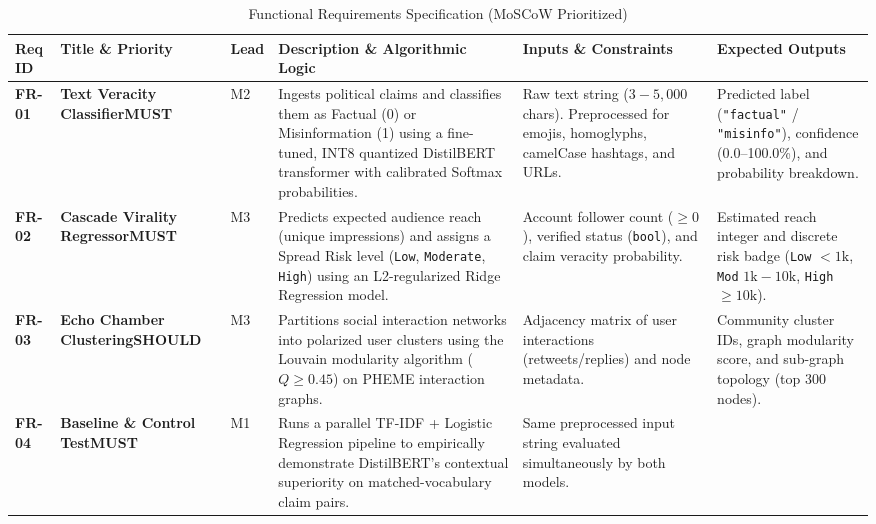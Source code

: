 \documentclass[11pt, a4paper]{article}
\newcommand{\badgeMust}{\colorbox{mustRedBg}{\textcolor{mustRedText}{\scriptsize\textsf{\textbf{MUST}}}}}
\newcommand{\badgeShould}{\colorbox{shouldAmberBg}{\textcolor{shouldAmberText}{\scriptsize\textsf{\textbf{SHOULD}}}}}
\newcommand{\code}[1]{\texttt{\small #1}}
\begin{document}
\begin{table}[H]
  \centering
  \scriptsize
  \caption{Functional Requirements Specification (MoSCoW Prioritized)}
  \label{tab:functional-requirements}
  \begin{tabularx}{\textwidth}{@{}C{1.1cm} L{2.2cm} C{0.8cm} Y L{3.1cm} L{2.8cm}@{}}
    \toprule
    \textbf{Req ID} & \textbf{Title \& Priority} & \textbf{Lead} & \textbf{Description \& Algorithmic Logic} & \textbf{Inputs \& Constraints} & \textbf{Expected Outputs} \\
    \midrule
    \textbf{FR-01} & \textbf{Text Veracity Classifier}\newline\badgeMust & M2 &
    Ingests political claims and classifies them as Factual (0) or Misinformation (1) using a fine-tuned, INT8 quantized DistilBERT transformer with calibrated Softmax probabilities. &
    Raw text string ($3 - 5,000$ chars). Preprocessed for emojis, homoglyphs, camelCase hashtags, and URLs. &
    Predicted label (\code{"factual"} / \code{"misinfo"}), confidence (0.0--100.0\%), and probability breakdown. \\
    \textbf{FR-02} & \textbf{Cascade Virality Regressor}\newline\badgeMust & M3 &
    Predicts expected audience reach (unique impressions) and assigns a Spread Risk level (\code{Low}, \code{Moderate}, \code{High}) using an L2-regularized Ridge Regression model. &
    Account follower count ($\ge 0$), verified status (\code{bool}), and claim veracity probability. &
    Estimated reach integer and discrete risk badge (\code{Low} $<1\text{k}$, \code{Mod} $1\text{k}-10\text{k}$, \code{High} $\ge 10\text{k}$). \\
    \textbf{FR-03} & \textbf{Echo Chamber Clustering}\newline\badgeShould & M3 &
    Partitions social interaction networks into polarized user clusters using the Louvain modularity algorithm ($Q \ge 0.45$) on PHEME interaction graphs. &
    Adjacency matrix of user interactions (retweets/replies) and node metadata. &
    Community cluster IDs, graph modularity score, and sub-graph topology (top 300 nodes). \\
    \textbf{FR-04} & \textbf{Baseline \& Control Test}\newline\badgeMust & M1 &
    Runs a parallel TF-IDF + Logistic Regression pipeline to empirically demonstrate DistilBERT's contextual superiority on matched-vocabulary claim pairs. &
    Same preprocessed input string evaluated simultaneously by both models. &

\end{tabularx}
\end{table}
\end{document}
